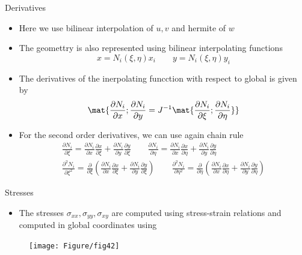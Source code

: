 	\begin{frame}{Derivatives}
		\begin{itemize}
			\item Here we use bilinear interpolation of $u,v$ and hermite of $w$
			\item The geomettry is also represented using bilinear interpolating functions
			\begin{equation}
				x = N_i(\xi,\eta)x_i \qquad y = N_i(\xi,\eta) y_i
			\end{equation}
			\item The derivatives of the inerpolating funcction with respect to global is given by
			\begin{equation}
				\mat{\frac{\partial N_i}{\partial x}; \frac{\partial N_i}{\partial y} = J^{-1} 
					\mat{\frac{\partial N_i}{\partial \xi}; \frac{\partial N_i}{\partial \eta}}}
			\end{equation}
			\item For the second order derivatives, we can use again chain rule
			\begin{equation}
			\begin{aligned}
				\frac{\partial N_i}{\partial \xi} = \frac{\partial N_i}{\partial x}\frac{\partial  x}{\partial \xi} + \frac{\partial N_i}{\partial y}\frac{\partial  y}{\partial \xi}
				\qquad
				\frac{\partial N_i}{\partial \eta} = \frac{\partial N_i}{\partial x}\frac{\partial  x}{\partial \eta} + \frac{\partial N_i}{\partial y}\frac{\partial  y}{\partial \eta} \\
				\frac{\partial^2 N_i}{\partial \xi^2} = \frac{\partial }{\partial \xi}\left(\frac{\partial N_i}{\partial x}\frac{\partial  x}{\partial \xi} + \frac{\partial N_i}{\partial y}\frac{\partial  y}{\partial \xi} \right)		\qquad
				\frac{\partial^2 N_i}{\partial \eta^2} = \frac{\partial }{\partial \eta}\left(\frac{\partial N_i}{\partial x}\frac{\partial  x}{\partial \eta} + \frac{\partial N_i}{\partial y}\frac{\partial  y}{\partial \eta} \right)		  
			\end{aligned}
			\end{equation}
		\end{itemize}
	\end{frame}


	\begin{frame}{Stresses}
		\begin{itemize}
			\item The stresses $\sigma_{xx},\sigma_{yy},\sigma_{xy}$ are computed using stress-strain relations and computed in global coordinates using 		
		\end{itemize}
		\begin{figure}
			\centering
			\texttt{[image: Figure/fig42]}  		
		\end{figure}
	\end{frame}

